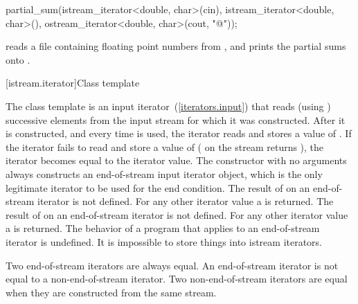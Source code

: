 \enterexample
\begin{codeblock}
partial_sum(istream_iterator<double, char>(cin),
  istream_iterator<double, char>(),
  ostream_iterator<double, char>(cout, "@\textbackslash@n"));
\end{codeblock}

reads a file containing floating point numbers from
,
and prints the partial sums onto
.
\exitexample

[istream.iterator]{Class template }

\pnum
{}%
The class template
is an input iterator~(\ref{iterators.input}) that
reads (using
)
successive elements from the input stream for which it was constructed.
After it is constructed, and every time
\tcode{++}
is used, the iterator reads and stores a value of
.
If the iterator fails to read and store a value of 
(
on the stream returns
),
the iterator becomes equal to the
iterator value.
The constructor with no arguments
always constructs
an end-of-stream input iterator object, which is the only legitimate iterator to be used
for the end condition.
The result of
on an end-of-stream iterator is not defined.
For any other iterator value a
is returned.
The result of
on an end-of-stream iterator is not defined.
For any other iterator value a
is returned.
The behavior of a program that applies  to an end-of-stream
iterator is undefined.
It is impossible to store things into istream iterators.

\pnum
Two end-of-stream iterators are always equal.
An end-of-stream iterator is not
equal to a non-end-of-stream iterator.
Two non-end-of-stream iterators are equal when they are constructed from the same stream.

